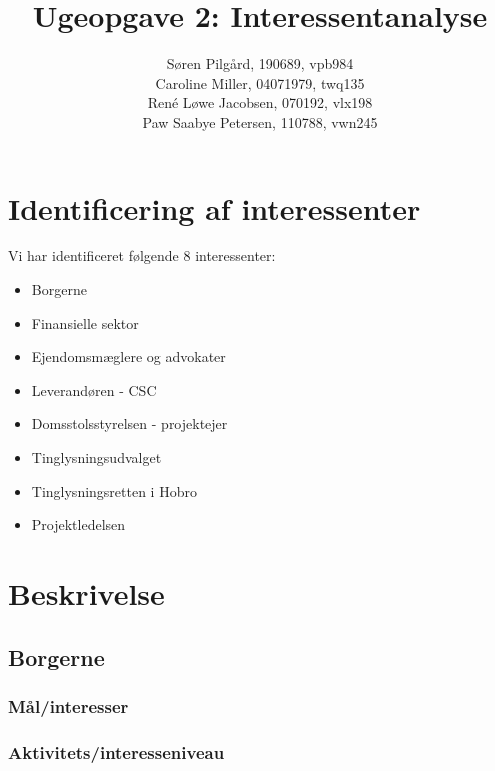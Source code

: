 \documentclass[10pt,a4paper,danish]{article}
\title{Ugeopgave 2: Interessentanalyse}
\author{Søren Pilgård, 190689, vpb984\\
Caroline Miller, 04071979, twq135\\
René Løwe Jacobsen, 070192, vlx198\\
Paw Saabye Petersen, 110788, vwn245}
\begin{document}
\maketitle
\newpage


\section{Identificering af interessenter}





Vi har identificeret følgende 8 interessenter:
\begin{itemize}
\item Borgerne
\item Finansielle sektor
\item Ejendomsmæglere og advokater
\item Leverandøren - CSC
\item Domsstolsstyrelsen - projektejer
\item Tinglysningsudvalget
\item Tinglysningsretten i Hobro
\item Projektledelsen
\end{itemize}

\section{Beskrivelse}
\subsection{Borgerne}
\subsubsection{Mål/interesser}

\subsubsection{Aktivitets/interesseniveau}
\end{document}
